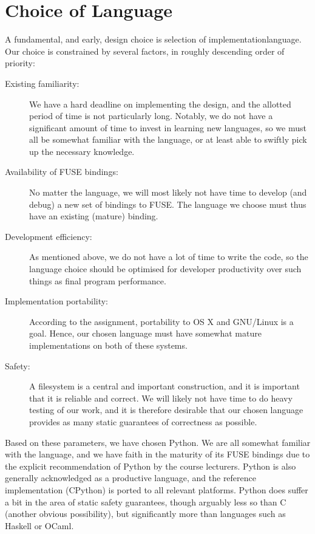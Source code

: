 \documentclass[12pt]{article}
\begin{document}
\section{Choice of Language}
 
A fundamental, and early, design choice is selection of implementationlanguage. Our choice is constrained by several factors, in roughly
descending order of priority:
 
\begin{description}
\item[Existing familiarity: ] We have a hard deadline on
  implementing the design, and the allotted period of time is not
  particularly long. Notably, we do not have a significant amount of
time to invest in learning new languages, so we must all be somewhat  familiar with the language, or at least able to swiftly pick up the
  necessary knowledge.
\item[Availability of FUSE bindings: ] No matter the language, we will  most likely not have time to develop (and debug) a new set of
  bindings to FUSE. The language we choose must thus have an existing
  (mature) binding.
\item[Development efficiency: ] As mentioned above, we do not have a
  lot of time to write the code, so the language choice should be
  optimised for developer productivity over such things as final
  program performance.
\item[Implementation portability: ] According to the assignment,
  portability to OS X and GNU/Linux is a goal. Hence, our chosen
  language must have somewhat mature implementations on both of these
  systems.
\item[Safety: ] A filesystem is a central and important construction,
  and it is important that it is reliable and correct. We will likely
  not have time to do heavy testing of our work, and it is therefore
  desirable that our chosen language provides as many static
  guarantees of correctness as possible.
\end{description}
 
Based on these parameters, we have chosen Python. We are all somewhat
familiar with the language, and we have faith in the maturity of its
FUSE bindings due to the explicit recommendation of Python by the
course lecturers. Python is also generally acknowledged as a
productive language, and the reference implementation (CPython) is
ported to all relevant platforms. Python does suffer a bit in the
area of static safety guarantees, though arguably less so than C
(another obvious possibility), but significantly more than languages
such as Haskell or OCaml.
 
\end{document}
